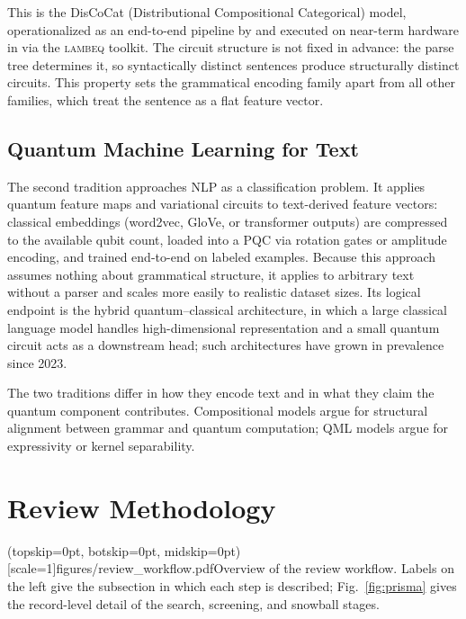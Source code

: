\documentclass{ieeeaccess}
\begin{document}
This is the DisCoCat (Distributional Compositional Categorical) model, operationalized as an end-to-end pipeline by \cite{lorenz_qnlp_2023} and executed on near-term hardware in \cite{meichanetzidis_quantum_2021, meichanetzidis_grammar-aware_2023} via the \textsc{lambeq} toolkit. The circuit structure is not fixed in advance: the parse tree determines it, so syntactically distinct sentences produce structurally distinct circuits. This property sets the grammatical encoding family apart from all other families, which treat the sentence as a flat feature vector.

\subsection{Quantum Machine Learning for Text}

The second tradition approaches NLP as a classification problem. It applies quantum feature maps \cite{schuld2019quantum} and variational circuits \cite{cerezo2021variational} to text-derived feature vectors: classical embeddings (word2vec, GloVe, or transformer outputs) are compressed to the available qubit count, loaded into a PQC via rotation gates or amplitude encoding, and trained end-to-end on labeled examples. Because this approach assumes nothing about grammatical structure, it applies to arbitrary text without a parser and scales more easily to realistic dataset sizes. Its logical endpoint is the hybrid quantum--classical architecture, in which a large classical language model handles high-dimensional representation and a small quantum circuit acts as a downstream head; such architectures have grown in prevalence since 2023.

The two traditions differ in how they encode text and in what they claim the quantum component contributes. Compositional models argue for structural alignment between grammar and quantum computation; QML models argue for expressivity or kernel separability.

\section{Review Methodology}
\label{sec:method}

\Figure[t!](topskip=0pt, botskip=0pt, midskip=0pt)[scale=1]{figures/review_workflow.pdf}{Overview of the review workflow. Labels on the left give the subsection in which each step is described; Fig.~\ref{fig:prisma} gives the record-level detail of the search, screening, and snowball stages.\label{fig:workflow}}
\end{document}
